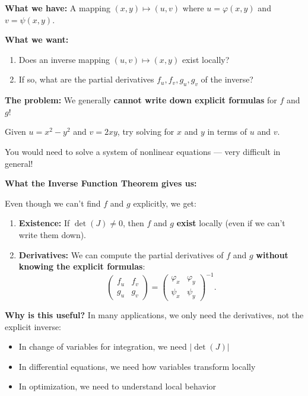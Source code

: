 \documentclass[11pt]{report}
\begin{document}
\textbf{What we have:} A mapping $(x, y) \mapsto (u, v)$ where $u = \varphi(x,y)$ and $v = \psi(x,y)$.

\textbf{What we want:}
\begin{enumerate}[itemsep=2pt]
    \item Does an inverse mapping $(u, v) \mapsto (x, y)$ exist locally?
    \item If so, what are the partial derivatives $f_u, f_v, g_u, g_v$ of the inverse?
\end{enumerate}

\textbf{The problem:} We generally \textbf{cannot write down explicit formulas} for $f$ and $g$!

\begin{example}
Given $u = x^2 - y^2$ and $v = 2xy$, try solving for $x$ and $y$ in terms of $u$ and $v$. 

You would need to solve a system of nonlinear equations --- very difficult in general!
\end{example}

\textbf{What the Inverse Function Theorem gives us:}

Even though we can't find $f$ and $g$ explicitly, we get:
\begin{enumerate}[itemsep=2pt]
    \item \textbf{Existence:} If $\det(J) \neq 0$, then $f$ and $g$ \textbf{exist} locally (even if we can't write them down).
    \item \textbf{Derivatives:} We can compute the partial derivatives of $f$ and $g$ \textbf{without knowing the explicit formulas}:
    \[
    \begin{pmatrix} f_u & f_v \\ g_u & g_v \end{pmatrix} = \begin{pmatrix} \varphi_x & \varphi_y \\ \psi_x & \psi_y \end{pmatrix}^{-1}.
    \]
\end{enumerate}

\textbf{Why is this useful?} In many applications, we only need the derivatives, not the explicit inverse:
\begin{itemize}[itemsep=2pt]
    \item In change of variables for integration, we need $|\det(J)|$
    \item In differential equations, we need how variables transform locally
    \item In optimization, we need to understand local behavior
\end{itemize}
\end{document}
